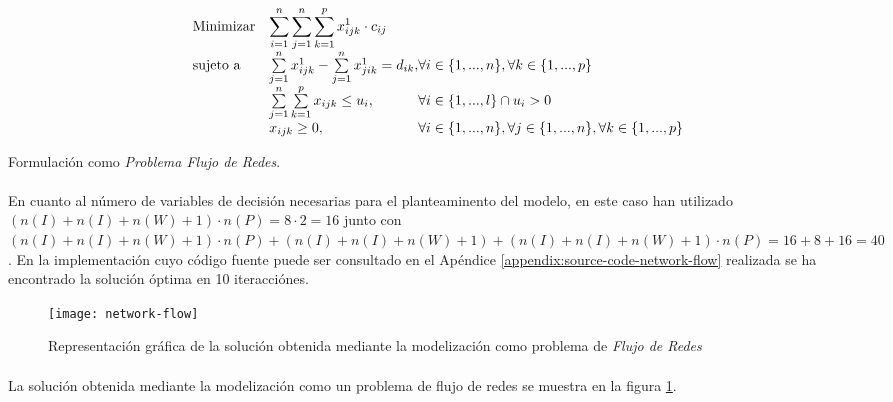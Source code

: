 \documentclass[a4paper, spanish]{article}
\begin{document}
    \begin{eqfloat}
      \begin{equation}
        \begin{array}{ll@{}ll}
          \text{Minimizar}	& \displaystyle \sum\limits_{i=1}^{n}\sum\limits_{j=1}^{n}\sum\limits_{k=1}^{p} x^{1}_{ijk} \cdot c_{ij} \\
          \text{sujeto a}		& \sum\limits_{j=1}^{n} x^{1}_{ijk} - \sum\limits_{j=1}^{n} x^{1}_{jik} = d_{ik}, & \forall i \in \{1,...,n\}, \forall k \in \{1,...,p\}\\
                            &	\sum\limits_{j=1}^{n}\sum\limits_{k=1}^{p}  x_{ijk}	\leq u_{i}, 		  & \forall i \in \{1,...,l\} \cap u_{i} > 0\\
                            & x_{ijk}	\geq 0, 	& \forall i \in \{1,...,n\}, \forall j \in \{1,...,n\}, \forall k \in \{1,...,p\}
        \end{array}
      \end{equation}
      \caption{Formulación como \emph{Problema Flujo de Redes}.}
      \label{eq:network-flow-model}
    \end{eqfloat}

    \paragraph{}
    En cuanto al número de variables de decisión necesarias para el planteaminento del modelo, en este caso han utilizado $ (n(I) + n(I) + n(W) + 1) \cdot n(P) = 8 \cdot 2 = 16$ junto con $(n(I) + n(I) + n(W) + 1) \cdot n(P) + (n(I) + n(I) + n(W) + 1) + (n(I) + n(I) + n(W) + 1) \cdot n(P) = 16 + 8 + 16 = 40$. En la implementación cuyo código fuente puede ser consultado en el Apéndice \ref{appendix:source-code-network-flow} realizada se ha encontrado la solución óptima en 10 iteracciónes.


    \begin{figure}[!hp]
      \centering
      \texttt{[image: network-flow]}
      \caption{Representación gráfica de la solución obtenida mediante la modelización como problema de \emph{Flujo de Redes}}
      \label{img:graph-network-flow}
    \end{figure}

    \paragraph{}
    La solución obtenida mediante la modelización como un problema de flujo de redes se muestra en la figura \ref{img:graph-network-flow}.
\end{document}

